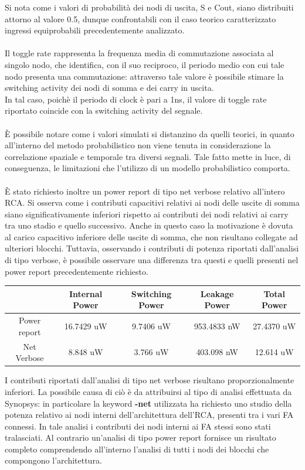 \documentclass[11pt,  english, makeidx, a4paper, titlepage, oneside]{book}
\begin{document}
Si nota come i valori di probabilità dei
nodi di uscita, S e Cout, siano distribuiti attorno al valore 0.5, dunque confrontabili con il caso teorico caratterizzato ingressi equiprobabili precedentemente analizzato.
\\\\
Il toggle rate rappresenta la frequenza media di commutazione associata al singolo nodo, che identifica, con il suo reciproco, il periodo medio
con cui tale nodo presenta una commutazione: attraverso tale valore è possibile stimare la switching activity dei nodi di somma e dei carry in uscita.
\\
In tal caso, poichè il periodo di clock è pari a 1ns, il valore di toggle rate riportato coincide con la switching activity del segnale.
\\\\
È possibile notare come i valori simulati si distanzino da quelli teorici, in quanto all'interno del metodo probabilistico non viene tenuta in considerazione la correlazione spaziale e temporale tra diversi segnali. Tale fatto mette in luce, di conseguenza, le limitazioni che l'utilizzo di un modello probabilistico comporta.
\\\\
È stato richiesto inoltre un power report di tipo net verbose relativo all'intero RCA. Si osserva come i contributi capacitivi relativi
ai nodi delle uscite di somma siano significativamente inferiori rispetto ai contributi dei nodi relativi ai carry tra uno stadio e quello successivo.
Anche in questo caso la motivazione è dovuta al carico capacitivo inferiore delle uscite di somma, che non risultano collegate ad ulteriori
blocchi. Tuttavia, osservando i contributi di potenza riportati dall'analisi di tipo verbose, è possibile osservare una differenza tra questi e 
quelli presenti nel power report precedentemente richiesto. 
\\
\begin{center}
	\begin{tabular}{|c|c|c|c|c|}
	\hline
	& Internal Power & Switching Power & Leakage Power & Total Power \\ 
	\hline
	Power report & 16.7429 uW & 9.7406 uW & 953.4833 nW & 27.4370 uW \\
	\hline
	Net Verbose & 8.848 uW & 3.766 uW & 403.098 nW & 12.614 uW \\
	\hline
	\end{tabular}
\end{center}
\vspace{0.3cm}
I contributi riportati dall'analisi di tipo net verbose risultano proporzionalmente inferiori. La possibile causa di ciò è da attribuirsi al tipo
di analisi effettuata da Synopsys: in particolare la keyword \textbf{-net} utilizzata ha richiesto uno studio della potenza relativo ai nodi interni
dell'architettura dell'RCA, presenti tra i vari FA connessi. In tale analisi i contributi dei nodi interni ai FA stessi sono stati
tralasciati. Al contrario un'analisi di tipo power report fornisce un risultato completo comprendendo all'interno l'analisi di tutti i nodi dei
blocchi che compongono l'architettura.
\newpage
\end{document}
